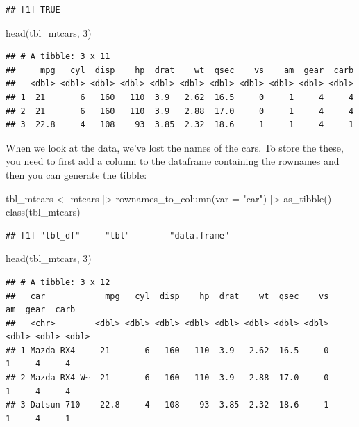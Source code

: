 \documentclass[
  12pt,
  oneside]{book}
\newenvironment{Shaded}{\begin{snugshade}}{\end{snugshade}}
\newcommand{\AttributeTok}[1]{\textcolor[rgb]{0.77,0.63,0.00}{#1}}
\newcommand{\DecValTok}[1]{\textcolor[rgb]{0.00,0.00,0.81}{#1}}
\newcommand{\FunctionTok}[1]{\textcolor[rgb]{0.00,0.00,0.00}{#1}}
\newcommand{\NormalTok}[1]{#1}
\newcommand{\OtherTok}[1]{\textcolor[rgb]{0.56,0.35,0.01}{#1}}
\newcommand{\SpecialCharTok}[1]{\textcolor[rgb]{0.00,0.00,0.00}{#1}}
\newcommand{\StringTok}[1]{\textcolor[rgb]{0.31,0.60,0.02}{#1}}
\theoremstyle{definition}
\theoremstyle{definition}
\theoremstyle{definition}
\theoremstyle{definition}
\theoremstyle{remark}
\begin{document}
\begin{verbatim}
## [1] TRUE
\end{verbatim}

\begin{Shaded}
\begin{Highlighting}[]
\FunctionTok{head}\NormalTok{(tbl\_mtcars, }\DecValTok{3}\NormalTok{)}
\end{Highlighting}
\end{Shaded}

\begin{verbatim}
## # A tibble: 3 x 11
##     mpg   cyl  disp    hp  drat    wt  qsec    vs    am  gear  carb
##   <dbl> <dbl> <dbl> <dbl> <dbl> <dbl> <dbl> <dbl> <dbl> <dbl> <dbl>
## 1  21       6   160   110  3.9   2.62  16.5     0     1     4     4
## 2  21       6   160   110  3.9   2.88  17.0     0     1     4     4
## 3  22.8     4   108    93  3.85  2.32  18.6     1     1     4     1
\end{verbatim}

When we look at the data, we've lost the names of the cars. To store the these, you need to first add a column to the dataframe containing the rownames and then you can generate the tibble:

\begin{Shaded}
\begin{Highlighting}[]
\NormalTok{tbl\_mtcars }\OtherTok{\textless{}{-}}\NormalTok{ mtcars }\SpecialCharTok{|\textgreater{}} 
  \FunctionTok{rownames\_to\_column}\NormalTok{(}\AttributeTok{var =} \StringTok{"car"}\NormalTok{) }\SpecialCharTok{|\textgreater{}}
  \FunctionTok{as\_tibble}\NormalTok{() }
\FunctionTok{class}\NormalTok{(tbl\_mtcars)}
\end{Highlighting}
\end{Shaded}

\begin{verbatim}
## [1] "tbl_df"     "tbl"        "data.frame"
\end{verbatim}

\begin{Shaded}
\begin{Highlighting}[]
\FunctionTok{head}\NormalTok{(tbl\_mtcars, }\DecValTok{3}\NormalTok{)}
\end{Highlighting}
\end{Shaded}

\begin{verbatim}
## # A tibble: 3 x 12
##   car            mpg   cyl  disp    hp  drat    wt  qsec    vs    am  gear  carb
##   <chr>        <dbl> <dbl> <dbl> <dbl> <dbl> <dbl> <dbl> <dbl> <dbl> <dbl> <dbl>
## 1 Mazda RX4     21       6   160   110  3.9   2.62  16.5     0     1     4     4
## 2 Mazda RX4 W~  21       6   160   110  3.9   2.88  17.0     0     1     4     4
## 3 Datsun 710    22.8     4   108    93  3.85  2.32  18.6     1     1     4     1
\end{verbatim}
\end{document}
